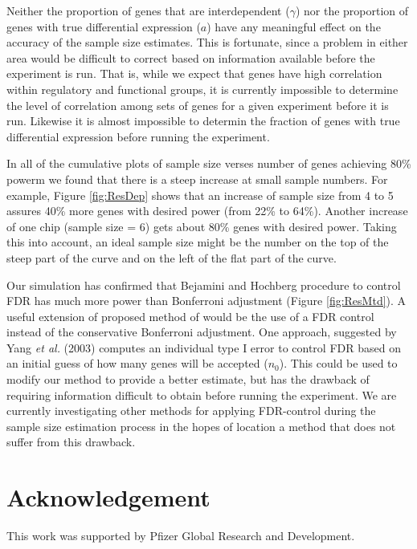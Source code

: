 \documentclass{bioinfo}
\begin{document}
Neither the proportion of genes that are interdependent ($\gamma$)
nor the proportion of genes with true differential expression ($a$)
have any meaningful effect on the accuracy of the sample size
estimates.  This is fortunate, since a problem in either area would
be difficult to correct based on information available before the
experiment is run.  That is, while we expect that genes have high
correlation within regulatory and functional groups, it is currently
impossible to determine the level of correlation among sets of genes
for a given experiment before it is run.  Likewise it is almost
impossible to determin the fraction of genes with true differential
expression before running the experiment.

In all of the cumulative plots of sample size verses number of genes
achieving 80\% powerm we found that there is a steep increase at
small sample numbers. For example, Figure \ref{fig:ResDep} shows
that an increase of sample size from 4 to 5 assures 40\% more genes
with desired power (from 22\% to 64\%).  Another increase of one
chip (sample size = 6) gets about 80\% genes with desired
power. Taking this into account, an ideal sample size might be the
number on the top of the steep part of the curve and on the left of
the flat part of the curve.

Our simulation has confirmed that Bejamini and Hochberg procedure to
control FDR has much more power than Bonferroni adjustment (Figure
\ref{fig:ResMtd}). A useful extension of proposed method of
would be the use of a FDR control instead of the conservative
Bonferroni adjustment. One approach, suggested by Yang \textit{et
al.} (2003) computes an individual type I error to control FDR based
on an initial guess of how many genes will be accepted ($n_0$). This
could be used to modify our method to provide a better estimate, but
has the drawback of requiring information difficult to obtain before
running the experiment.  We are currently investigating other
methods for applying FDR-control during the sample size estimation
process in the hopes of location a method that does not suffer from
this drawback.


\section*{Acknowledgement}
This work was supported by Pfizer Global Research and Development.
\end{document}
